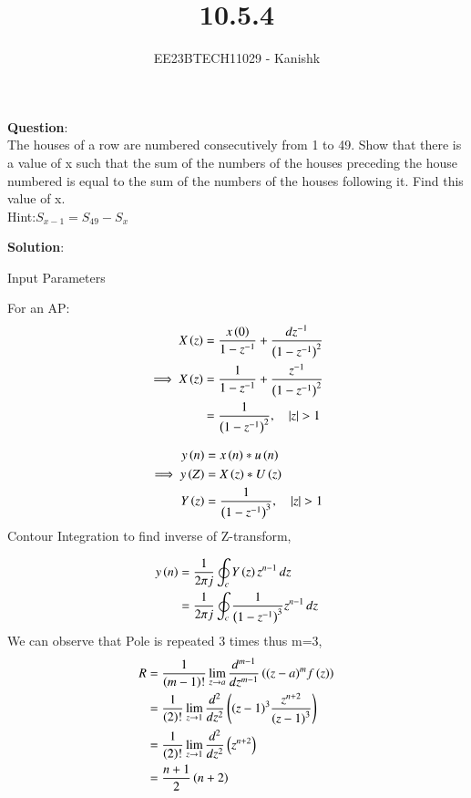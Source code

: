 \documentclass[journal,12pt,twocolumn]{IEEEtran}
\theoremstyle{remark}
\begin{document}

\vspace{3cm}

\title{10.5.4}
\author{EE23BTECH11029 - Kanishk}
\maketitle
\newpage

\bigskip

\renewcommand{\thefigure}{\theenumi}
\renewcommand{\thetable}{\theenumi}
\textbf{Question}:\\
The houses of a row are numbered consecutively from 1 to 49. Show that there is a value
of x such that the sum of the numbers of the houses preceding the house numbered is equal to the sum of the numbers of the houses following it. Find this value of x.\\
Hint:$ S_{x-1}=S_{49}-S_x$

\textbf{Solution}:\\

\begin{table}[ht]
    \centering
    \def\arraystretch{1.5}
    
   \caption{Input Parameters}
   \label{tab:10.5.4}
\end{table}


For an AP:
\begin{align}
X\left(z\right)&=\frac{x\left(0\right)}{1-z^{-1}}+ \frac{dz^{-1}}{\left(1-z^{-1}\right)^{2}}\\
\implies X\left(z\right)&=\frac{1}{1-z^{-1}}+ \frac{z^{-1}}{\left(1-z^{-1}\right)^{2}}\\
&=\frac{1}{\left(1-z^{-1}\right)^{2}},\quad \left\vert z\right\vert > 1
\end{align}

\begin{align}
y\left(n\right)&=x\left(n\right)*u\left(n\right)\\
\implies y\left(Z\right)&=X\left(z\right)*U\left(z\right)\\
Y\left(z\right)&= \frac{1}{\left(1-z^{-1}\right)^{3}},\quad \left\vert z\right\vert>1
\end{align}
Contour Integration to find inverse of Z-transform,

\begin{align}
y\left(n\right)&=\frac{1}{2\pi j}\oint_c Y\left(z\right)z^{n-1} \,dz\\
&=\frac{1}{2\pi j} \oint_c \frac{1}{\left(1-z^{-1}\right)^{3}}z^{n-1} \,dz
\end{align}
We can observe that Pole is repeated 3 times thus m=3,
\begin{align}
R&=\frac{1}{\left(m-1\right)!}\lim\limits_{z\to a}\frac{d^{m-1}}{dz^{m-1}}\left({(z-a)}^{m}f\left(z\right)\right)  \\
&=\frac{1}{\left(2\right)!}\lim\limits_{z\to 1}\frac{d^{2}}{dz^{2}}\left({(z-1)}^{3}\frac{z^{n+2}}{{(z-1)}^3}\right)\\
&=\frac{1}{\left(2\right)!}\lim\limits_{z\to 1}\frac{d^{2}}{dz^{2}}\left(z^{n+2}\right)\\
&=\frac{n+1}{2}\left(n+2\right)
\end{align}
\end{document}
